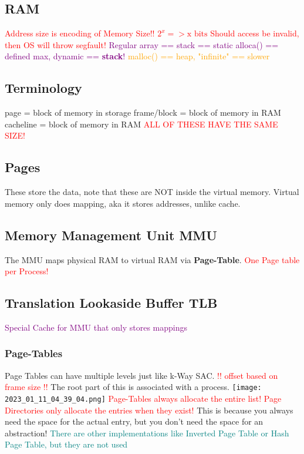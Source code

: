 \documentclass[main.tex,fontsize=7pt,paper=a4,paper=landscape,DIV=calc,]{scrartcl}
\begin{document}
\begin{multicols*}{4}
\section{RAM}
\textcolor{red}{Address size is encoding of Memory Size!! \(2^x => \text{x bits}\)}\newline
\textcolor{red}{Should access be invalid, then OS will throw segfault!}\newline
\textcolor{purple}{Regular array == stack == static}\newline
\textcolor{purple}{alloca() == defined max, dynamic == \textbf{stack}!}\newline
\textcolor{orange}{malloc() == heap, "infinite" == slower} 

\subsection{Terminology}
page = block of memory in storage
frame/block = block of memory in RAM
cacheline = block of memory in RAM
\textcolor{red}{ALL OF THESE HAVE THE SAME SIZE!}

\subsection{Pages}
These store the data, note that these are NOT inside the virtual memory.\newline
Virtual memory only does mapping, aka it stores addresses, unlike cache.

\subsection{Memory Management Unit MMU}
The MMU maps physical RAM to virtual RAM via \textbf{Page-Table}.\newline
\textcolor{red}{One Page table per Process!}

\subsection{Translation Lookaside Buffer TLB}
\textcolor{purple}{Special Cache for MMU that only stores mappings}

\subsubsection{Page-Tables}
Page Tables can have multiple levels just like k-Way SAC. \textcolor{red}{!! offset based on frame size !!}\newline
The root part of this is associated with a process.\newline
\texttt{[image: 2023\_01\_11\_04\_39\_04.png]}\newline
\textcolor{red}{Page-Tables always allocate the entire list! Page Directories only allocate the entries when they exist!}\newline
This is because you always need the space for the actual entry, but you don't need the space for an abstraction!
\textcolor{teal}{There are other implementations like Inverted Page Table or Hash Page Table, but they are not used}


\end{multicols*}
\end{document}

